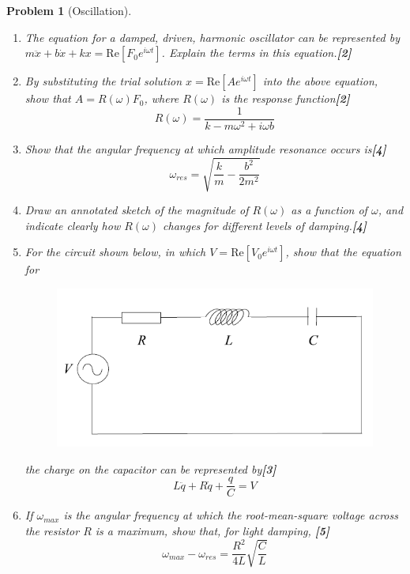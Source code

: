 \documentclass[a4paper]{article}
\theoremstyle{new}
\newtheorem{qns}{Problem}[subsection]
\begin{document}
\begin{qns}[Oscillation]\leavevmode
\begin{enumerate}[label=(\roman*)]
\item The equation for a damped, driven, harmonic oscillator can be represented by $m\ddot{x}+b\dot{x}+kx=\text{Re}[F_0e^{i\omega t}]$. Explain the terms in this equation.\hfill\textbf{[2]}
\item By substituting the trial solution $x=\text{Re}[Ae^{i\omega t}]$ into the above equation, show that $A = R(\omega)F_0$, where $R(\omega)$ is the response function\hfill\textbf{[2]}
$$R(\omega)=\frac{1}{k-m\omega^2+i\omega b}$$
\item Show that the angular frequency at which amplitude resonance occurs is\hfill\textbf{[4]}
$$\omega_{res}=\sqrt{\frac{k}{m}-\frac{b^2}{2m^2}}$$
\item Draw an annotated sketch of the magnitude of $R(\omega)$ as a function of $\omega$, and indicate clearly how $R(\omega)$ changes for different levels of damping.\hfill\textbf{[4]}
\item For the circuit shown below, in which $V=\text{Re}[V_0e^{i\omega t}]$, show that the equation for
\begin{figure}[H]
    \centering
    \includegraphics[scale=0.5]{2013P2B7Q.PNG}
\end{figure}
the charge on the capacitor can be represented by\hfill\textbf{[3]}
$$L\ddot{q}+R\dot{q}+\frac{q}{C}=V$$
\item If $\omega_{max}$ is the angular frequency at which the root-mean-square voltage across the resistor $R$ is a maximum, show that, for light damping, \hfill\textbf{[5]}
$$\omega_{max}-\omega_{res}=\frac{R^2}{4L}\sqrt{\frac{C}{L}}$$
\end{enumerate}
\end{qns}
\end{document}
